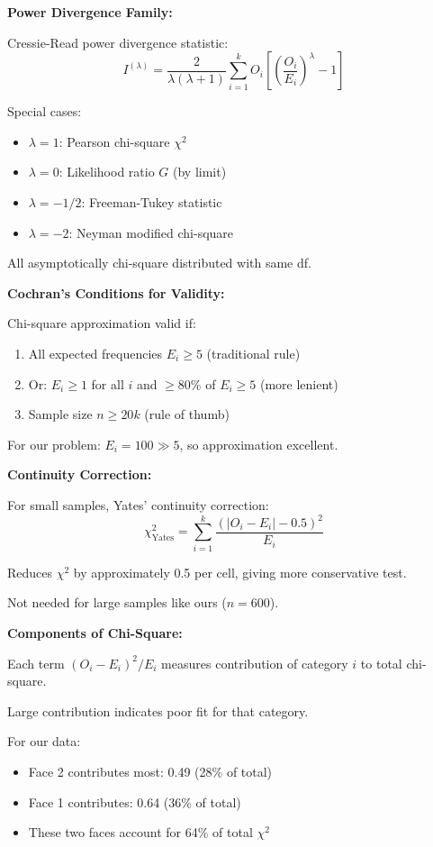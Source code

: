 \documentclass[12pt]{article}
\begin{document}
\begin{explanation}
\textbf{Power Divergence Family:}

Cressie-Read power divergence statistic:
\[
I^{(\lambda)} = \frac{2}{\lambda(\lambda+1)}\sum_{i=1}^k O_i\left[\left(\frac{O_i}{E_i}\right)^\lambda - 1\right]
\]

Special cases:
\begin{itemize}
    \item $\lambda = 1$: Pearson chi-square $\chi^2$
    \item $\lambda = 0$: Likelihood ratio $G$ (by limit)
    \item $\lambda = -1/2$: Freeman-Tukey statistic
    \item $\lambda = -2$: Neyman modified chi-square
\end{itemize}

All asymptotically chi-square distributed with same df.

\textbf{Cochran's Conditions for Validity:}

Chi-square approximation valid if:
\begin{enumerate}
    \item All expected frequencies $E_i \geq 5$ (traditional rule)
    \item Or: $E_i \geq 1$ for all $i$ and $\geq 80\%$ of $E_i \geq 5$ (more lenient)
    \item Sample size $n \geq 20k$ (rule of thumb)
\end{enumerate}

For our problem: $E_i = 100 \gg 5$, so approximation excellent.

\textbf{Continuity Correction:}

For small samples, Yates' continuity correction:
\[
\chi^2_{\text{Yates}} = \sum_{i=1}^k \frac{(|O_i - E_i| - 0.5)^2}{E_i}
\]

Reduces $\chi^2$ by approximately 0.5 per cell, giving more conservative test.

Not needed for large samples like ours ($n = 600$).

\textbf{Components of Chi-Square:}

Each term $(O_i - E_i)^2/E_i$ measures contribution of category $i$ to total chi-square.

Large contribution indicates poor fit for that category.

For our data:
\begin{itemize}
    \item Face 2 contributes most: 0.49 (28\% of total)
    \item Face 1 contributes: 0.64 (36\% of total)
    \item These two faces account for 64\% of total $\chi^2$
\end{itemize}


\end{explanation}
\end{document}
